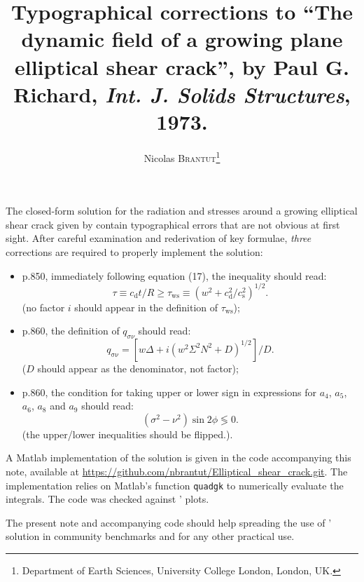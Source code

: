 \documentclass[11pt]{article}
\title{Typographical corrections to ``The dynamic field of a growing plane elliptical shear crack'', by Paul G. Richard, \emph{Int. J. Solids Structures}, 1973.}
\author{Nicolas \textsc{Brantut}\thanks{Department of Earth Sciences, University College London, London, UK.}}
\begin{document}
\maketitle

The closed-form solution for the radiation and stresses around a growing elliptical shear crack given by \citet{richards73} contain typographical errors that are not obvious at first sight. After careful examination and rederivation of key formulae, \emph{three} corrections are required to properly implement the solution:
\begin{itemize}
\item p.850, immediately following equation (17), the inequality should read:
  \begin{equation}\label{eq:c1}
    \tau\equiv
    c_\mathrm{d}t/R\geq\tau_\mathrm{ws}\equiv(w^2+c_\mathrm{d}^2/c_\mathrm{s}^2)^{1/2}.
  \end{equation}
  (no factor $i$ should appear in the definition of $\tau_\mathrm{ws}$);
\item p.860, the definition of $q_{\sigma\nu}$ should read:
  \begin{equation}\label{eq:c2}
    q_\mathrm{\sigma\nu} = [w\Delta + i(w^2\Sigma^2N^2 + D)^{1/2}]/D.
  \end{equation}
  ($D$ should appear as the denominator, not factor);
\item p.860, the condition for taking upper or lower sign in expressions for $a_4$, $a_5$, $a_6$, $a_8$ and $a_9$ should read:
  \begin{equation}\label{eq:c3}
    (\sigma^2-\nu^2)\sin2\phi \lessgtr 0.
  \end{equation}
  (the upper/lower inequalities should be flipped.).
\end{itemize}

A Matlab implementation of the solution is given in the code accompanying this note, available at \url{https://github.com/nbrantut/Elliptical_shear_crack.git}. The implementation relies on Matlab's function \verb+quadgk+ to numerically evaluate the integrals. The code was checked against \citeauthor{richards73}' plots.

The present note and accompanying code should help spreading the use of \citeauthor{richards73}' solution in community benchmarks and for any other practical use.



\end{document}
